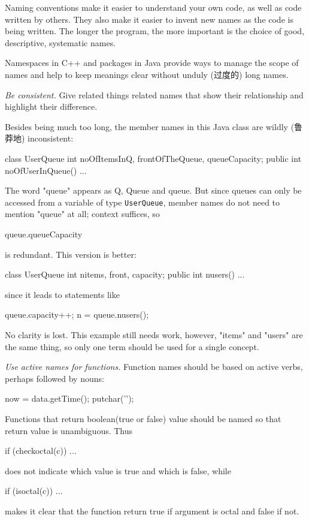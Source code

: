 Naming conventions make it easier to understand your own code, as well as
code written by others. They also make it easier to invent new names as the
code is being written. The longer the program, the more important is the
choice of good, descriptive, systematic names.

Namespaces in C++ and packages in Java provide ways to manage the scope of
names and help to keep meanings clear without unduly (过度的) long names.

\emph{Be consistent.} Give related things related names that show their
relationship and highlight their difference.

Besides being much too long, the member names in this Java class are
wildly (鲁莽地) inconsistent:
\begin{badcode}
    class UserQueue {
        int noOfItemsInQ, frontOfTheQueue, queueCapacity;
        public int noOfUserInQueue() { ... }
    }
\end{badcode}
The word "queue" appears as Q, Queue and queue. But since queues can only
be accessed from a variable of type \verb"UserQueue", member names do not
need to mention "queue" at all; context suffices, so 
\begin{badcode}
    queue.queueCapacity
\end{badcode}
is redundant. This version is better:
\begin{wellcode}
    class UserQueue {
        int nitems, front, capacity;
        public int nusers() { ... }
    }
\end{wellcode}
since it leads to statements like 
\begin{wellcode}
    queue.capacity++;
    n = queue.nusers();
\end{wellcode}
No clarity is lost. This example still needs work, however, "items" and
"users" are the same thing, so only one term should be used for a single
concept.

\emph{Use active names for functions.} Function names should be based on
active verbs, perhaps followed by nouns:
\begin{wellcode}
    now = data.getTime();
    putchar('\n');
\end{wellcode}
Functions that return boolean(true or false) value should be named so that
return value is unambiguous. Thus
\begin{badcode}
    if (checkoctal(c)) ...
\end{badcode}
does not indicate which value is true and which is false, while 
\begin{wellcode}
    if (isoctal(c)) ...
\end{wellcode}
makes it clear that the function return true if argument is octal and false
if not.

